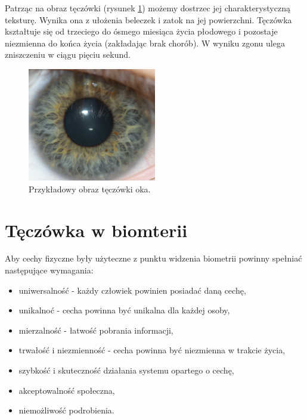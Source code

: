 Patrząc na obraz tęczówki (rysunek \ref{fig:irisExample}) możemy dostrzec jej charakterystyczną teksturę. Wynika ona z ułożenia
beleczek i zatok na jej powierzchni. Tęczówka kształtuje się od trzeciego do ósmego miesiąca życia
płodowego i pozostaje niezmienna do końca życia (zakładając brak chorób).
W wyniku zgonu ulega zniszczeniu w ciągu pięciu sekund.

\begin{figure}[ht]
  \centering
  \includegraphics[width=0.5\textwidth]{images/intro/irisExample.png}
  \caption{Przykładowy obraz tęczówki oka.}
  \label{fig:irisExample}
\end{figure}

\section{Tęczówka w biomterii}

Aby cechy fizyczne były użyteczne z punktu widzenia biometrii powinny spełnia\'c następujące
wymagania:

\begin{itemize}
  \item uniwersalnoś\'c - każdy człowiek powinien posiada\'c daną cechę,
  \item unikalno\'c - cecha powinna by\'c unikalna dla każdej osoby,
  \item mierzalnoś\'c - łatwoś\'c pobrania informacji,
  \item trwałoś\'c i niezmiennoś\'c - cecha powinna by\'c niezmienna w trakcie życia,
  \item szybkoś\'c i skutecznoś\'c działania systemu opartego o cechę,
  \item akceptowalnoś\'c społeczna,
  \item niemożliwoś\'c podrobienia.
\end{itemize}

